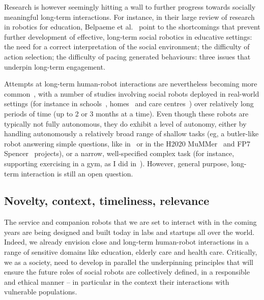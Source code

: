 Research is however seemingly hitting a wall to further progress towards
socially meaningful long-term interactions. For instance, in their large review
of research in robotics for education, Belpaeme et al.~\parencite{belpaeme2018social}
point to the shortcomings that prevent further development of effective,
long-term social robotics in educative settings: the need for a correct
interpretation of the social environment; the difficulty of action selection;
the difficulty of pacing generated behaviours: three issues that underpin
long-term engagement.

Attempts at long-term human-robot interactions are nevertheless becoming more
common~\parencite{kunze2018artificial,leite2013social}, with a number of studies
involving social robots deployed in real-world settings (for instance in
schools~\parencite{leite2014empathic,westlund2017measuring,
lemaignan2016learning,coninx2016towards}, homes~\parencite{degraaf2017phased} and
care centres~\parencite{hawes2017strands,winkle2020couch}) over relatively long
periods of time (up to 2 or 3 months at a time). Even though these robots are
typically not fully autonomous, they do exhibit a level of autonomy, either by
handling autonomously a relatively broad range of shallow tasks (eg, a
butler-like robot answering simple questions, like in~\parencite{hawes2017strands} or
in the H2020 MuMMer~\parencite{heikkila2018can} and FP7
Spencer~\parencite{triebel2016spencer} projects), or a narrow, well-specified complex
task (for instance, supporting exercising in a gym, as I did in~\parencite{winkle2020couch}).
However, general purpose, long-term interaction is still an open question.


\subsection{Novelty, context, timeliness, relevance}

The service and companion robots that we are set to interact with in the coming
years are being designed and built today in labs and startups all over the
world. Indeed, we already envision close and long-term human-robot interactions
in a range of sensitive domains like education, elderly care and health care.
Critically, we as a society, need to develop in parallel the underpinning
principles that will ensure the future roles of social robots are collectively
defined, in a responsible and ethical manner -- in particular in the context
their interactions with vulnerable populations.

